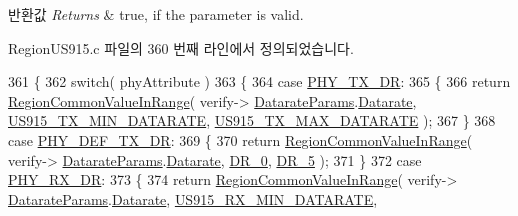\begin{DoxyRetVals}{반환값}
{\em Returns} & true, if the parameter is valid. \\
\hline
\end{DoxyRetVals}


Region\+U\+S915.\+c 파일의 360 번째 라인에서 정의되었습니다.


\begin{DoxyCode}
361 \{
362     \textcolor{keywordflow}{switch}( phyAttribute )
363     \{
364         \textcolor{keywordflow}{case} \mbox{\hyperlink{group___r_e_g_i_o_n_gga51cbe8f5433d914fe9cf81b451de2c2da62c19af9dc2c54540562e1158c015f57}{PHY\_TX\_DR}}:
365         \{
366             \textcolor{keywordflow}{return} \mbox{\hyperlink{group___r_e_g_i_o_n_c_o_m_m_o_n_gafdd1c80d953e18d755a631b72a9c3bd3}{RegionCommonValueInRange}}( verify->
      \mbox{\hyperlink{unionu_verify_params_a92427be16343eb3d9c14334eb95ec058}{DatarateParams}}.\mbox{\hyperlink{structu_verify_params_1_1s_datarate_params_ae2f6080f3aa0e9485c55513ca56bb24d}{Datarate}}, \mbox{\hyperlink{group___r_e_g_i_o_n_u_s915_ga82ad1f3ace520fc55727e442784bdcb6}{US915\_TX\_MIN\_DATARATE}}, 
      \mbox{\hyperlink{group___r_e_g_i_o_n_u_s915_gafe9e1c8956875cd7ccdb8aec59ee6f9d}{US915\_TX\_MAX\_DATARATE}} );
367         \}
368         \textcolor{keywordflow}{case} \mbox{\hyperlink{group___r_e_g_i_o_n_gga51cbe8f5433d914fe9cf81b451de2c2da70c3923333165960549162e3dcf10467}{PHY\_DEF\_TX\_DR}}:
369         \{
370             \textcolor{keywordflow}{return} \mbox{\hyperlink{group___r_e_g_i_o_n_c_o_m_m_o_n_gafdd1c80d953e18d755a631b72a9c3bd3}{RegionCommonValueInRange}}( verify->
      \mbox{\hyperlink{unionu_verify_params_a92427be16343eb3d9c14334eb95ec058}{DatarateParams}}.\mbox{\hyperlink{structu_verify_params_1_1s_datarate_params_ae2f6080f3aa0e9485c55513ca56bb24d}{Datarate}}, \mbox{\hyperlink{group___r_e_g_i_o_n_ga6c4ef966b4f3d5eb7597b087f2b97095}{DR\_0}}, \mbox{\hyperlink{group___r_e_g_i_o_n_ga872e12c82020c02a7f70a1c6ed1375df}{DR\_5}} );
371         \}
372         \textcolor{keywordflow}{case} \mbox{\hyperlink{group___r_e_g_i_o_n_gga51cbe8f5433d914fe9cf81b451de2c2da8cc3b895173b07ee71127e366c8d0d55}{PHY\_RX\_DR}}:
373         \{
374             \textcolor{keywordflow}{return} \mbox{\hyperlink{group___r_e_g_i_o_n_c_o_m_m_o_n_gafdd1c80d953e18d755a631b72a9c3bd3}{RegionCommonValueInRange}}( verify->
      \mbox{\hyperlink{unionu_verify_params_a92427be16343eb3d9c14334eb95ec058}{DatarateParams}}.\mbox{\hyperlink{structu_verify_params_1_1s_datarate_params_ae2f6080f3aa0e9485c55513ca56bb24d}{Datarate}}, \mbox{\hyperlink{group___r_e_g_i_o_n_u_s915_ga44b4b0c33d7fbd6190937e2608b8ae71}{US915\_RX\_MIN\_DATARATE}}, 

\end{DoxyCode}
